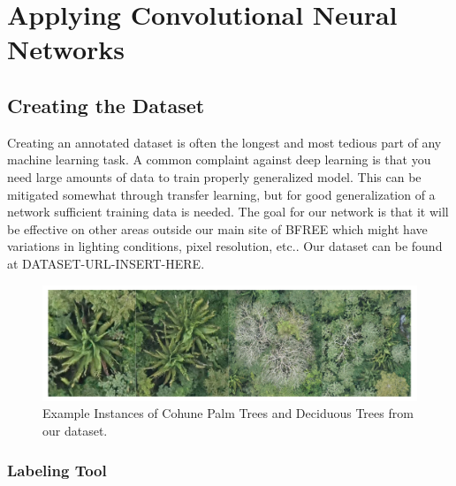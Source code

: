 
\chapter{Applying Convolutional Neural Networks} %

\label{Chapter4}


\section{Creating the Dataset}

Creating an annotated dataset is often the longest and most tedious part of any machine learning task. A common complaint against deep learning is that you need large amounts of data to train properly generalized model. This can be mitigated somewhat through transfer learning, but for good generalization of a network sufficient training data is needed. The goal for our network is that it will be effective on other areas outside our main site of BFREE which might have variations in lighting conditions, pixel resolution, etc.. Our dataset can be found at DATASET-URL-INSERT-HERE.

\begin{figure}[ht]
\includegraphics[width=1.0\textwidth]{Figures/Palm-Deciduous.png}
\caption{Example Instances of Cohune Palm Trees and Deciduous Trees from our dataset.}
\label{fig:Palm-Deciduous}
\end{figure}

\subsection{Labeling Tool}

